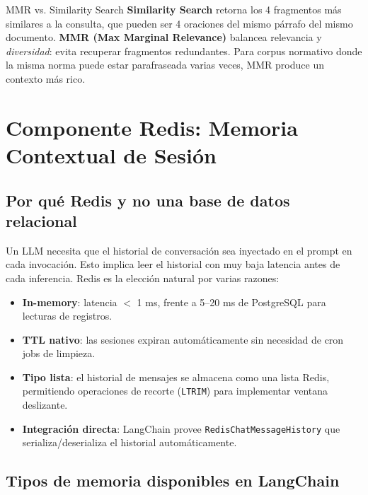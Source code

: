 \documentclass[12pt,a4paper]{article}
\begin{document}
\begin{infobox}{MMR vs. Similarity Search}
\textbf{Similarity Search} retorna los 4 fragmentos más similares a la
consulta, que pueden ser 4 oraciones del mismo párrafo del mismo documento.
\textbf{MMR (Max Marginal Relevance)} balancea relevancia y \textit{diversidad}:
evita recuperar fragmentos redundantes. Para corpus normativo donde la misma
norma puede estar parafraseada varias veces, MMR produce un contexto más rico.
\end{infobox}

\section{Componente Redis: Memoria Contextual de Sesión}
\label{sec:redis}

\subsection{Por qué Redis y no una base de datos relacional}

Un LLM necesita que el historial de conversación sea inyectado en el
prompt en cada invocación. Esto implica leer el historial con muy baja
latencia antes de cada inferencia. Redis es la elección natural por
varias razones:

\begin{itemize}
  \item \textbf{In-memory}: latencia $<$ 1 ms, frente a 5--20 ms de
    PostgreSQL para lecturas de registros.
  \item \textbf{TTL nativo}: las sesiones expiran automáticamente sin
    necesidad de cron jobs de limpieza.
  \item \textbf{Tipo lista}: el historial de mensajes se almacena como
    una lista Redis, permitiendo operaciones de recorte (\texttt{LTRIM})
    para implementar ventana deslizante.
  \item \textbf{Integración directa}: LangChain provee
    \texttt{RedisChatMessageHistory} que serializa/deserializa el
    historial automáticamente.
\end{itemize}

\subsection{Tipos de memoria disponibles en LangChain}
\end{document}
